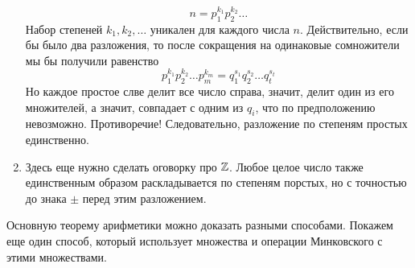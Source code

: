 \begin{enumerate}
$$
n=p_1^{k_1}p_2^{k_2}\dots
$$
Набор степеней $k_1,k_2,\dots$ уникален для каждого числа $n$. Действительно, если бы было два разложения, то после сокращения на одинаковые сомножители мы бы получили равенство
$$
p_1^{k_1}p_2^{k_2}\dots p_m^{k_m} = q_1^{s_1}q_2^{s_2}\dots q_t^{s_t}
$$
Но каждое простое слве делит все число справа, значит, делит один из его множителей, а значит, совпадает с одним из $q_i$, что по предположению невозможно. Противоречие! Следовательно, разложение по степеням простых единственно.
\item Здесь еще нужно сделать оговорку про $\mathbb Z$. Любое целое число также единственным образом раскладывается по степеням порстых, но с точностью до знака $\pm$ перед этим разложением.
\end{enumerate}

Основную теорему арифметики можно доказать разными способами. Покажем еще один способ, который использует множества и операции Минковского с этими множествами.

